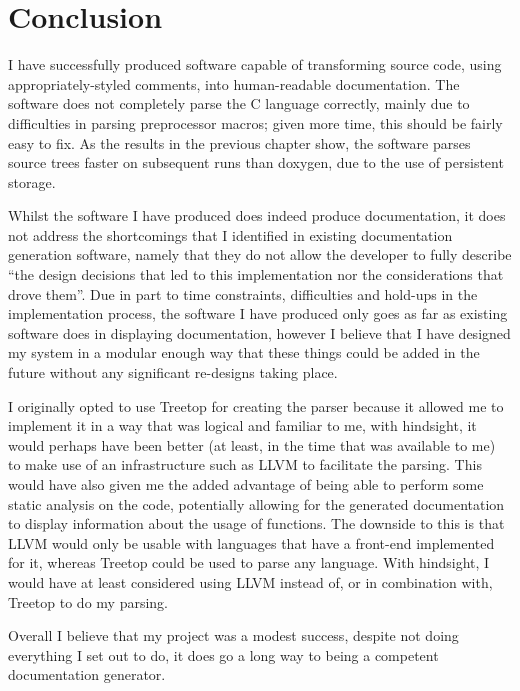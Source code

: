 
\chapter{Conclusion}
I have successfully produced software capable of transforming source code, using
appropriately-styled comments, into human-readable documentation. The software
does not completely parse the C language correctly, mainly due to difficulties
in parsing preprocessor macros; given more time, this should be fairly easy to
fix. As the results in the previous chapter show, the software parses source
trees faster on subsequent runs than doxygen, due to the use of persistent
storage.

Whilst the software I have produced does indeed produce documentation, it does
not address the shortcomings that I identified in existing documentation
generation software, namely that they do not allow the developer to fully
describe ``the design decisions that led to this implementation nor the
considerations that drove them''. Due in part to time constraints, difficulties
and hold-ups in the implementation process, the software I have produced only
goes as far as existing software does in displaying documentation, however I
believe that I have designed my system in a modular enough way that these things
could be added in the future without any significant re-designs taking place.

I originally opted to use Treetop for creating the parser because it allowed me
to implement it in a way that was logical and familiar to me, with hindsight, it
would perhaps have been better (at least, in the time that was available to me)
to make use of an infrastructure such as LLVM\cite{website:llvm} to facilitate
the parsing. This would have also given me the added advantage of being able to
perform some static analysis on the code, potentially allowing for the generated
documentation to display information about the usage of functions. The downside
to this is that LLVM would only be usable with languages that have a front-end
implemented for it, whereas Treetop could be used to parse any language. With
hindsight, I would have at least considered using LLVM instead of, or in
combination with, Treetop to do my parsing.

Overall I believe that my project was a modest success, despite not doing
everything I set out to do, it does go a long way to being a competent
documentation generator.
